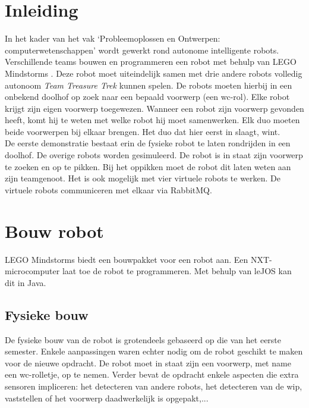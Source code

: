 \documentclass[tt1]{penoverslag}
\begin{document}
\newpage


\section{Inleiding} %
\label{ssec:inl}
In het kader van het vak `Probleemoplossen en Ontwerpen: computerwetenschappen' wordt gewerkt rond autonome intelligente robots. Verschillende teams bouwen en programmeren een robot met behulp van LEGO Mindstorms \cite{mindstorms}. Deze robot moet uiteindelijk samen met drie andere robots volledig autonoom \textit{Team Treasure Trek} kunnen spelen.
De robots moeten hierbij in een onbekend doolhof op zoek naar een bepaald voorwerp (een wc-rol). Elke robot krijgt zijn eigen voorwerp toegewezen. Wanneer een robot zijn voorwerp gevonden heeft, komt hij te weten met welke robot hij moet samenwerken. Elk duo moeten beide voorwerpen bij elkaar brengen. Het duo dat hier eerst in slaagt, wint.\\

De eerste demonstratie bestaat erin de fysieke robot te laten rondrijden in een doolhof. De overige robots worden gesimuleerd. De robot is in staat zijn voorwerp te zoeken en op te pikken. Bij het oppikken moet de robot dit laten weten aan zijn teamgenoot. Het is ook mogelijk met vier virtuele robots te werken. De virtuele robots communiceren met elkaar via RabbitMQ.\\


\section{Bouw robot}
\label{ssec:bouwrob}
LEGO Mindstorms \cite{mindstorms} biedt een bouwpakket voor een robot aan. Een NXT-microcomputer laat toe de robot te programmeren. Met behulp van leJOS \cite{leJOS} kan dit in Java.


\subsection{Fysieke bouw}
\label{ssec:fysb}

De fysieke bouw van de robot is grotendeels gebaseerd op die van het eerste semester. Enkele aanpassingen waren echter nodig om de robot geschikt te maken voor de nieuwe opdracht. De robot moet in staat zijn een voorwerp, met name een wc-rolletje, op te nemen. Verder bevat de opdracht enkele aspecten die extra sensoren impliceren: het detecteren van andere robots, het detecteren van de wip, vaststellen of het voorwerp daadwerkelijk is opgepakt,...\\
 
\end{document}
